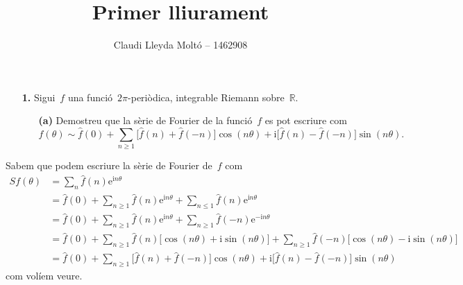 \documentclass[a4paper]{article}
\title{Primer lliurament}
\author{Claudi Lleyda Moltó -- 1462908}
\newcommand{\iu}{\mathrm{i}}
\newcommand{\e}{\mathrm{e}}
\newcommand{\uppi}{\pi}
\begin{document}
\maketitle

\begin{enumerate}
    \item[\textbf{1.}] Sigui~\(f\) una funció~\(2\uppi\)-periòdica, integrable
        Riemann sobre~\(\mathbb{R}\).
        \begin{enumerate}
            \item[\textbf{(a)}] Demostreu que la sèrie de Fourier de la
                funció~\(f\) es pot escriure com
                \[
                    f(\theta) \sim \widehat{f}(0) +
                    \sum_{n\geq1} \bigl[\widehat{f}(n) + \widehat{f}(-n)\bigr]
                    \cos(n\theta)
                    +
                    \iu\bigl[\widehat{f}(n)-\widehat{f}(-n)\bigr]\sin(n\theta).
                \]
        \end{enumerate}
\end{enumerate}
Sabem que podem escriure la sèrie de Fourier de~\(f\) com
\begin{align*}
    Sf(\theta) &= \sum_{n} \widehat{f}(n) \e^{\iu n\theta} \\
                 &= \widehat{f}(0)
                 + \sum_{n\geq1} \widehat{f}(n) \e^{\iu n\theta}
                 + \sum_{n\leq1} \widehat{f}(n) \e^{\iu n\theta}
                 \\
                 &= \widehat{f}(0)
                 + \sum_{n\geq1} \widehat{f}(n) \e^{\iu n\theta}
                 + \sum_{n\geq1} \widehat{f}(-n) \e^{-\iu n\theta} \\
                 &= \widehat{f}(0)
                 + \sum_{n\geq1} \widehat{f}(n)
                 \bigl[\cos(n\theta) + \iu\sin(n\theta)\bigr]
                 + \sum_{n\geq1} \widehat{f}(-n)
                 \bigl[\cos(n\theta) - \iu\sin(n\theta)\bigr] \\
                 &= \widehat{f}(0)
                 + \sum_{n\geq1}
                 \bigl[\widehat{f}(n)+\widehat{f}(-n)\bigr]\cos(n\theta)
                 + \iu\bigl[\widehat{f}(n)-\widehat{f}(-n)\bigr]\sin(n\theta)
\end{align*}
com volíem veure.
\end{document}
